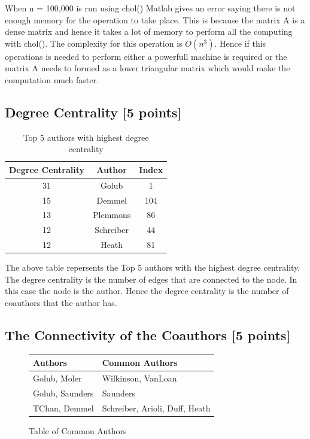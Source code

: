 \documentclass[unicode,11pt,a4paper,oneside,numbers=endperiod,openany]{scrartcl}
\begin{document}
When n = 100,000 is run using chol() Matlab gives an error saying there is not enough memory for the operation to take place. This is because the matrix A is a dense matrix and hence it takes a lot of memory to perform all the computing with chol(). The complexity for this operation is $O(n^3)$. Hence if this operations is needed to perform either a powerfull machine is required or the matrix A needs to formed as a lower triangular matrix which would make the computation much faster. \\

\subsection{Degree Centrality [5 points]}
\noindent
\begin{table}[H]
    \centering
    \begin{tabular}{|c|c|c|}
        \hline
        Degree Centrality & Author    & Index \\
        \hline
        31                & Golub     & 1     \\
        \hline
        15                & Demmel    & 104   \\
        \hline
        13                & Plemmons  & 86    \\
        \hline
        12                & Schreiber & 44    \\
        \hline
        12                & Heath     & 81    \\
        \hline
    \end{tabular}
    \caption{Top 5 authors with highest degree centrality}
\end{table}

The above table repersents the Top 5 authors with the highest degree centrality. The degree centrality is the number of edges that are connected to the node. In this case the node is the author. Hence the degree centrality is the number of coauthors that the author has. \\

\subsection{The Connectivity of the Coauthors [5 points]}

\begin{figure}[H]
    \centering
    \begin{tabular}{|l|l|}
        \hline
        Authors         & Common Authors                 \\
        \hline
        Golub, Moler    & Wilkinson, VanLoan             \\
        Golub, Saunders & Saunders                       \\
        TChan, Demmel   & Schreiber, Arioli, Duff, Heath \\
        \hline
    \end{tabular}
    \caption{Table of Common Authors}
\end{figure}
\end{document}
